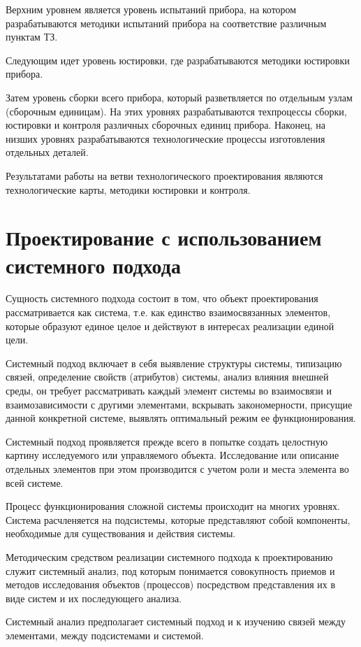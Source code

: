 Верхним уровнем является уровень испытаний прибора, на котором разрабатываются методики испытаний прибора на соответствие различным пунктам ТЗ.

Следующим идет уровень юстировки, где разрабатываются методики юстировки прибора.

Затем уровень сборки всего прибора, который разветвляется по отдельным узлам (сборочным единицам). На этих уровнях разрабатываются техпроцессы сборки, юстировки и контроля различных сборочных единиц прибора. Наконец, на низших уровнях разрабатываются технологические процессы изготовления отдельных деталей.

Результатами работы на ветви технологического проектирования являются технологические карты, методики юстировки и контроля.

\section{Проектирование с использованием системного подхода}
Сущность системного подхода состоит в том, что объект проектирования рассматривается как система, т.е. как единство взаимосвязанных элементов, которые образуют единое целое и действуют в интересах реализации единой цели. 

Системный подход включает в себя выявление структуры системы, типизацию связей, определение свойств (атрибутов) системы, анализ влияния внешней среды, он требует рассматривать каждый элемент системы во взаимосвязи и взаимозависимости с другими элементами, вскрывать закономерности, присущие данной конкретной системе, выявлять оптимальный режим ее функционирования. 

Системный подход проявляется прежде всего в попытке создать целостную картину исследуемого или управляемого объекта. 
Исследование или описание отдельных элементов при этом производится с учетом роли и места элемента во всей системе.

Процесс функционирования сложной системы происходит на многих уровнях. 
Система расчленяется на подсистемы, которые представляют собой компоненты, необходимые для существования и действия системы.

Методическим средством реализации системного подхода к проектированию служит системный анализ, под которым понимается совокупность приемов и методов исследования объектов (процессов) посредством представления их в виде систем и их последующего анализа.

Системный анализ предполагает системный подход и к изучению связей между элементами, между подсистемами и системой.

